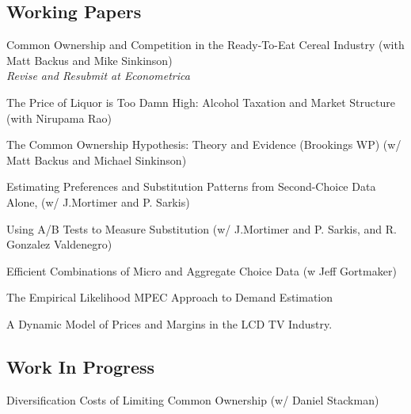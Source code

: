 \documentclass[letterpaper]{article}
\renewenvironment{itemize}{
  \begin{list}{}{
    \setlength{\leftmargin}{1.5em}
  }
}{
  \end{list}
}
\begin{document}
\subsection*{Working Papers}
\begin{itemize}
\item 
\item Common Ownership and Competition in the Ready-To-Eat Cereal Industry (with Matt Backus and Mike Sinkinson)  \\\textit{Revise and Resubmit at Econometrica} 
\item The Price of Liquor is Too Damn High: Alcohol Taxation and Market Structure (with Nirupama Rao)  
\item The Common Ownership Hypothesis: Theory and Evidence (Brookings WP) (w/ Matt Backus and Michael Sinkinson) 
\item Estimating Preferences and Substitution Patterns from Second-Choice Data Alone, (w/ J.Mortimer and P. Sarkis) 
\item Using A/B Tests to Measure Substitution (w/ J.Mortimer and P. Sarkis, and R. Gonzalez Valdenegro) 
\item Efficient Combinations of Micro and Aggregate Choice Data (w Jeff Gortmaker)

\item The Empirical Likelihood MPEC Approach to Demand Estimation\\ %
\item A Dynamic Model of Prices and Margins in the LCD TV Industry. 
\end{itemize}

\subsection*{Work In Progress}
\begin{itemize}
\item Diversification Costs of Limiting Common Ownership (w/ Daniel Stackman)
\end{itemize}
\end{document}
